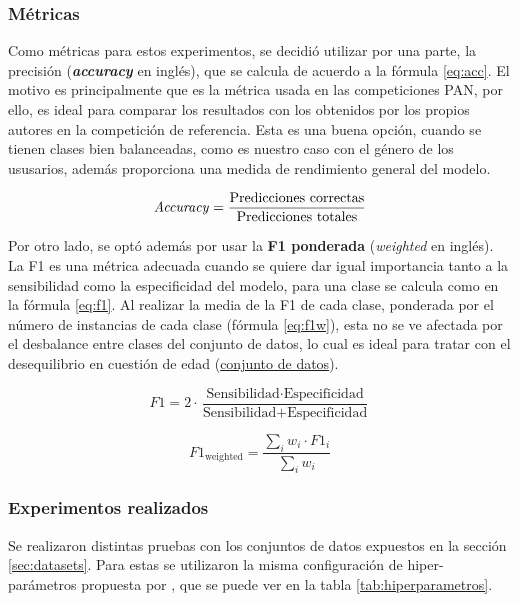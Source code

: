 \subsubsection{Métricas}
\label{subsubsec:metricas}
Como métricas para estos experimentos, se decidió utilizar por una parte, la precisión (\textit{\textbf{accuracy}} en inglés), que se calcula de acuerdo a la fórmula \ref{eq:acc}. El motivo es principalmente que es la métrica usada en las competiciones PAN, por ello, es ideal para comparar los resultados con los obtenidos por los propios autores en la competición de referencia. Esta es una buena opción, cuando se tienen clases bien balanceadas, como es nuestro caso con el género de los ususarios, además proporciona una medida de rendimiento general del modelo.


\begin{equation}
  \text{\textit{Accuracy}} = \frac{\text{Predicciones correctas}}{\text{Predicciones totales}}
  \label{eq:acc}
\end{equation}

Por otro lado, se optó además por usar la \textbf{F1 ponderada} (\textit{weighted} en inglés). La F1 es una métrica adecuada cuando se quiere dar igual importancia tanto a la sensibilidad como la especificidad del modelo, para una clase se calcula como en la fórmula \ref{eq:f1}. Al realizar la media de la F1 de cada clase, ponderada por el número de instancias de cada clase (fórmula \ref{eq:f1w}), esta no se ve afectada por el desbalance entre clases del conjunto de datos, lo cual es ideal para tratar con el desequilibrio en cuestión de edad (\hyperref[tab:datasets_edad]{conjunto de datos}). 

\begin{equation}
    F1 = 2 \cdot \frac{\text{Sensibilidad} \cdot \text{Especificidad}}{\text{Sensibilidad} + \text{Especificidad}}
      \label{eq:f1}
\end{equation}

\begin{equation}
    F1_{\text{weighted}} = \frac{\sum_{i} w_i \cdot F1_i}{\sum_{i} w_i}
  \label{eq:f1w}
\end{equation}

\subsubsection{Experimentos realizados}
Se realizaron distintas pruebas con los conjuntos de datos expuestos en la sección \ref{sec:datasets}. Para estas se utilizaron la misma configuración de hiper-parámetros propuesta por \citet{loscalis22}, que se puede ver en la tabla \ref{tab:hiperparametros}. 

